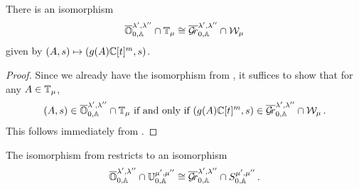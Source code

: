 \documentclass[draft]{article}
\begin{document}
\begin{theorem} 
\label{th:OGrl}
There is an isomorphism
$$
    \overline{\mathbb O}^{\lambda', \lambda''}_{0,\mathbb A} \cap \mathbb T_\mu \cong \overline{\mathcal{G}\!r}^{\lambda', \lambda''}_{0,\mathbb A} \cap \mathcal W_\mu 
$$
given by $ (A,s) \mapsto (g(A)\mathbb C[t]^m, s)$.
\end{theorem}
\begin{proof}
Since we already have the isomorphism from , it suffices to show that for any $ A \in \mathbb T_\mu$, 
$$ 
    (A,s) \in \overline{\mathbb O}^{\lambda', \lambda''}_{0,\mathbb A} \cap \mathbb T_\mu \text{ if and only if } (g(A)\mathbb C[t]^m, s) \in \overline{\mathcal{G}\!r}^{\lambda', \lambda''}_{0,\mathbb A} \cap \mathcal W_\mu \,. 
$$
This follows immediately from .
\end{proof}
% 
\begin{theorem}
\label{th:OTGrW}
The isomorphism from  
restricts to an isomorphism
$$ 
    \overline{\mathbb O}^{\lambda', \lambda''}_{0,\mathbb A} \cap \mathbb U^{\mu', \mu''}_{0,\mathbb A} \cong \overline{\mathcal{G}\!r}^{\lambda', \lambda''}_{0,\mathbb A} \cap S^{\mu', \mu''}_{0,\mathbb A}\,.
$$
\end{theorem}
% 
% 
% 
% 
% 
\end{document}
